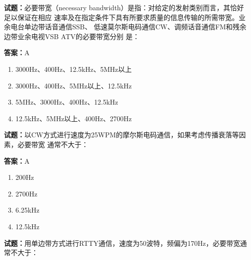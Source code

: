 \documentclass{ctexbook}
\begin{document}





\vspace{1em}

\textbf{试题：}必要带宽（necessary bandwidth）是指：对给定的发射类别而言，其恰好足以保证在相应
速率及在指定条件下具有所要求质量的信息传输的所需带宽。业余电台单边带话音通信SSB、
低速莫尔斯电码通信CW、调频话音通信FM和残余边带业余电视VSB ATV的必要带宽分别
是： 

\textbf{答案：}A 

\begin{enumerate}[leftmargin=3em]
  \item 3000Hz、400Hz、12.5kHz、5MHz以上 

  \item 3000Hz、400Hz、5MHz以上、12.5kHz 

  \item 5MHz、3000Hz、400Hz、12.5kHz 

  \item 12.5kHz、5MHz以上、400Hz、2700Hz 

\end{enumerate}





\vspace{1em}

\textbf{试题：}以CW方式进行速度为25WPM的摩尔斯电码通信，如果考虑传播衰落等因素，必要带宽
通常不大于： 

\textbf{答案：}A 

\begin{enumerate}[leftmargin=3em]
  \item 200Hz 

  \item 2700Hz 

  \item 6.25kHz 

  \item 12.5kHz 

\end{enumerate}





\vspace{1em}

\textbf{试题：}用单边带方式进行RTTY通信，速度为50波特，频偏为170Hz，必要带宽通常不大于： 
\end{document}
